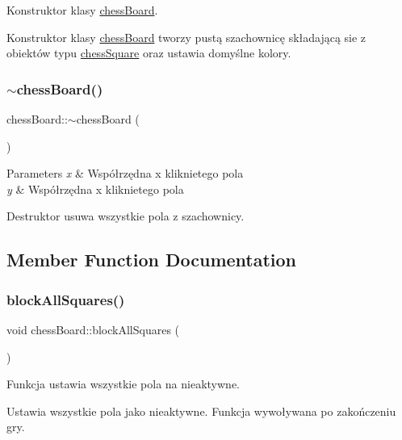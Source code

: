 Konstruktor klasy \hyperlink{classchess_board}{chess\+Board}. 

Konstruktor klasy \hyperlink{classchess_board}{chess\+Board} tworzy pustą szachownicę składającą sie z obiektów typu \hyperlink{classchess_square}{chess\+Square} oraz ustawia domyślne kolory. \mbox{\label{classchess_board_a91541e52c3b570ad4e06914786f33002}} 
\subsubsection{\texorpdfstring{$\sim$chess\+Board()}{~chessBoard()}}
{\footnotesize\ttfamily chess\+Board\+::$\sim$chess\+Board (\begin{DoxyParamCaption}{ }\end{DoxyParamCaption})}


\begin{DoxyParams}{Parameters}
{\em x} & Współrzędna x kliknietego pola \\
\hline
{\em y} & Współrzędna x kliknietego pola\\
\hline
\end{DoxyParams}
Destruktor usuwa wszystkie pola z szachownicy. 

\subsection{Member Function Documentation}
\mbox{\label{classchess_board_a3d7939233de9607a91357c3616f5db67}} 
\subsubsection{\texorpdfstring{block\+All\+Squares()}{blockAllSquares()}}
{\footnotesize\ttfamily void chess\+Board\+::block\+All\+Squares (\begin{DoxyParamCaption}{ }\end{DoxyParamCaption})}



Funkcja ustawia wszystkie pola na nieaktywne. 

Ustawia wszystkie pola jako nieaktywne. Funkcja wywoływana po zakończeniu gry. \mbox{\label{classchess_board_a429d72a00c66352a9657cba0625c981b}} 
